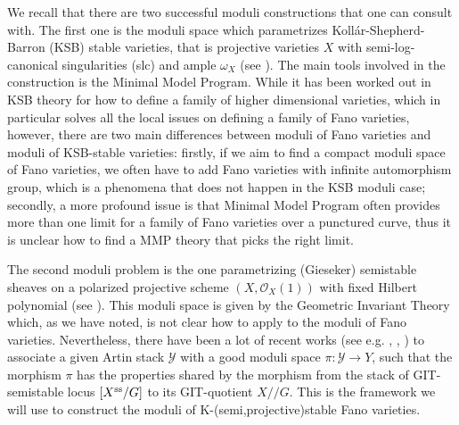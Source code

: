 \documentclass[12pt,reqno]{amsart}%
\theoremstyle{definition}
\theoremstyle{remark}
\begin{document}
We recall that there are two successful moduli constructions that one can consult with. The first one is the moduli space which parametrizes Koll\'ar-Shepherd-Barron (KSB) stable varieties, that is projective varieties $X$ with semi-log-canonical singularities (slc) and ample $\omega_X$ (see \cite{Kol13b}). The main tools involved in the construction is the Minimal Model Program. While it has been worked out in KSB theory for how to define a family of higher dimensional varieties, which in particular solves all the local issues on defining a family of Fano varieties,  however, there are two main differences between moduli of Fano varieties and moduli of KSB-stable varieties:  firstly, if we aim to find a compact moduli space of Fano varieties, we often have to add Fano varieties with infinite automorphism group, which is a phenomena that does not happen in the KSB moduli case; secondly, a more profound issue is that Minimal Model Program often provides more than one limit for a family of Fano varieties over a punctured curve, thus it is unclear how to find a  MMP theory that picks the right limit.


The second moduli problem is the one parametrizing (Gieseker) semistable sheaves on a polarized projective scheme $(X,\mathcal{O}_X(1))$ with fixed Hilbert polynomial (see \cite[Section 4]{HL10}).  This moduli space is given by the Geometric Invariant Theory which, as we have noted, is not clear how to apply to the moduli of Fano varieties. Nevertheless, there have been a lot of recent works (see e.g. \cite{Alp13}, \cite{AFS17}, \cite{AHH18}) to associate a given Artin stack $\mathcal{Y}$ with a good moduli space $\pi\colon \mathcal{Y}\to Y$, such that the morphism $\pi$ has the properties shared by the morphism from the stack of GIT-semistable locus $[X^{\rm ss}/ G]$ to its GIT-quotient $X/\!\!/G$.   This is the framework we will use to construct the moduli of K-(semi,projective)stable Fano varieties.

\medskip


\end{document}
